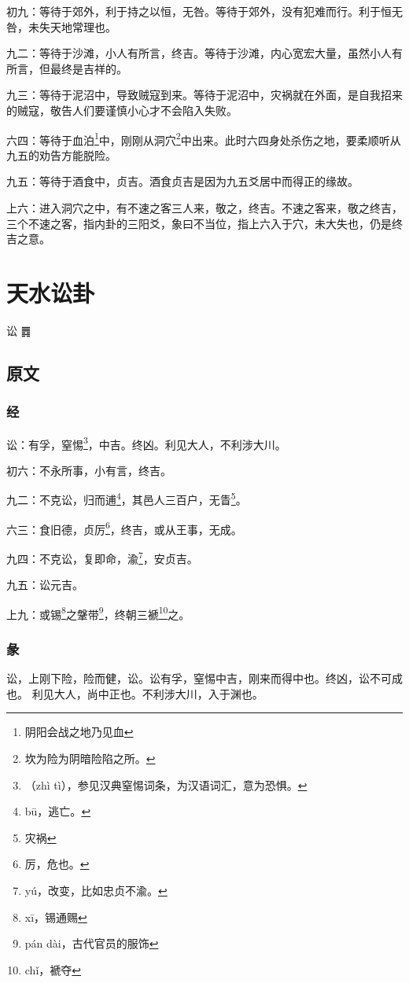 \documentclass[12pt,oneside]{book}
\begin{document}
初九：等待于郊外，利于持之以恒，无咎。等待于郊外，没有犯难而行。利于恒无咎，未失天地常理也。

九二：等待于沙滩，小人有所言，终吉。等待于沙滩，内心宽宏大量，虽然小人有所言，但最终是吉祥的。

九三：等待于泥沼中，导致贼寇到来。等待于泥沼中，灾祸就在外面，是自我招来的贼寇，敬告人们要谨慎小心才不会陷入失败。

六四：等待于血泊\footnote{阴阳会战之地乃见血}中，刚刚从洞穴\footnote{坎为险为阴暗险陷之所。}中出来。此时六四身处杀伤之地，要柔顺听从九五的劝告方能脱险。

九五：等待于酒食中，贞吉。酒食贞吉是因为九五爻居中而得正的缘故。

上六：进入洞穴之中，有不速之客三人来，敬之，终吉。不速之客来，敬之终吉，三个不速之客，指内卦的三阳爻，象曰不当位，指上六入于穴，未大失也，仍是终吉之意。



\chapter{天水讼卦}
讼 {\Large ䷅}

\section{原文}
\subsection{经}
讼：有孚，窒惕\footnote{（zhì tì），参见汉典窒惕词条，为汉语词汇，意为恐惧。}，中吉。终凶。利见大人，不利涉大川。

初六：不永所事，小有言，终吉。

九二：不克讼，归而逋\footnote{bū，逃亡。}，其邑人三百户，无眚\footnote{灾祸}。

六三：食旧德，贞厉\footnote{厉，危也。}，终吉，或从王事，无成。

九四：不克讼，复即命，渝\footnote{yú，改变，比如忠贞不渝。}，安贞吉。

九五：讼元吉。

上九：或锡\footnote{xī，锡通赐}之鞶带\footnote{pán dài，古代官员的服饰}，终朝三褫\footnote{chǐ，褫夺}之。

\subsection{彖}
讼，上刚下险，险而健，讼。讼有孚，窒惕中吉，刚来而得中也。终凶，讼不可成也。 利见大人，尚中正也。不利涉大川，入于渊也。
\end{document}
